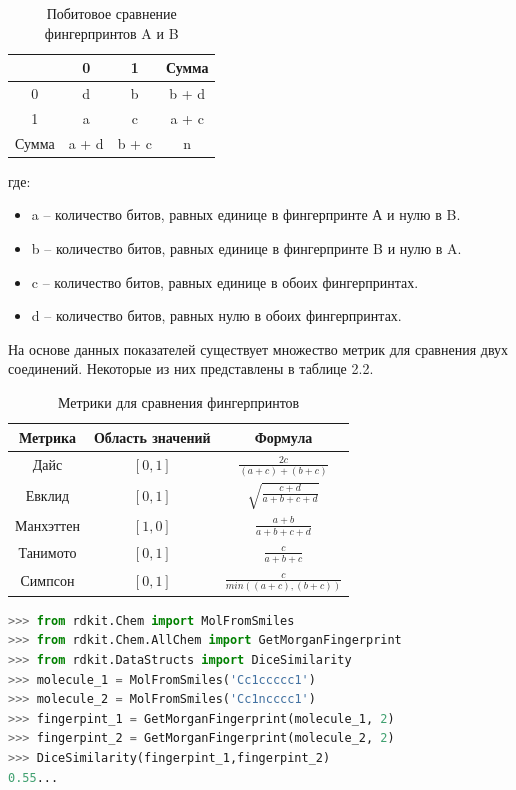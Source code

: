 \documentclass[a4paper,14pt]{extreport}
\begin{document}
\begin{table}  
\begin{center}
\begin{tabular}{|c|c|c|c|}
\hline
	& 0 & 1 & Сумма\\
\hline
	0 & d & b & b + d\\
\hline
	1 & a & c & a + c\\
\hline
	Сумма & a + d& b + c & n\\
\hline
\end{tabular}
\caption{Побитовое сравнение фингерпринтов A и B}
\end{center}
где:
\begin{itemize}
\item a – количество битов, равных единице в фингерпринте А и нулю в B.

\item b – количество битов, равных единице в фингерпринте B и нулю в A.

\item c – количество битов, равных единице в обоих фингерпринтах.

\item d – количество битов, равных нулю в обоих фингерпринтах.
\end{itemize}
\end{table}

\begin{table}[H]
На основе данных показателей существует множество метрик для сравнения двух соединений. Некоторые из них представлены в таблице 2.2.
\begin{center}
\begin{tabular}{|c|c|c|}
\hline
	Метрика & Область значений & Формула\\[2ex]
\hline
	Дайс & $[0, 1]$ & $\frac{2c}{(a+c)+(b+c)}$\\[5ex]
\hline
	Евклид & $[0, 1]$ & $\sqrt{\frac{c + d}{a + b + c + d}}$\\[5ex]
\hline
	Манхэттен & $[1, 0]$ & $\frac{a + b}{a + b + c + d}$\\[5ex]
\hline
	Танимото & $[0, 1]$ & $\frac{c}{a + b + c}$\\[5ex]
\hline
	Симпсон & $[0, 1]$ & $\frac{c}{min((a+c),(b+c))}$\\[5ex]
\hline
\end{tabular}
\caption{Метрики для сравнения фингерпринтов}
\end{center}
\end{table}
\newpage
\begin{lstlisting}[language=Python, caption=Использование метрики Дайса и библиотеки RDKit для сравнения двух фингерпринтов Моргана]
>>> from rdkit.Chem import MolFromSmiles
>>> from rdkit.Chem.AllChem import GetMorganFingerprint
>>> from rdkit.DataStructs import DiceSimilarity
>>> molecule_1 = MolFromSmiles('Cc1ccccc1')
>>> molecule_2 = MolFromSmiles('Cc1ncccc1')
>>> fingerpint_1 = GetMorganFingerprint(molecule_1, 2)
>>> fingerpint_2 = GetMorganFingerprint(molecule_2, 2)
>>> DiceSimilarity(fingerpint_1,fingerpint_2)
0.55...
\end{lstlisting}
\end{document}
